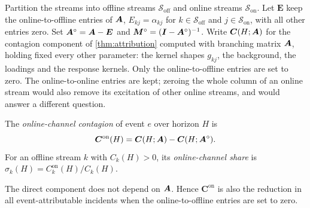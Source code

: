 Partition the streams into offline streams $\mathcal S_{\mathrm{off}}$ and online
streams $\mathcal S_{\mathrm{on}}$. Let $\bm E$ keep the online-to-offline entries of
$\bm{A}$, $E_{kj}=\alpha_{kj}$ for $k\in\mathcal S_{\mathrm{off}}$ and
$j\in\mathcal S_{\mathrm{on}}$, with all other entries zero. Set
$\bm{A}^\circ=\bm{A}-\bm E$ and $\bm{M}^\circ=(\bm{I}-\bm{A}^\circ)^{-1}$. Write
$\bm C(H;\bm{A})$ for the contagion component of \cref{thm:attribution} computed with
branching matrix $\bm{A}$, holding fixed every other parameter: the kernel shapes
$g_{kj}$, the background, the loadings and the response kernels. Only the
online-to-offline entries are set to zero. The online-to-online entries are kept;
zeroing the whole column of an online stream would also remove its excitation of
other online streams, and would answer a different question.

\begin{definition}\label{def:at-channel}
The \emph{online-channel contagion} of event $e$ over horizon $H$ is
\[
\bm C^{\mathrm{on}}(H)=\bm C(H;\bm{A})-\bm C(H;\bm{A}^\circ).
\]
For an offline stream $k$ with $C_k(H)>0$, its \emph{online-channel share} is
$\sigma_k(H)=C^{\mathrm{on}}_k(H)/C_k(H)$.
\end{definition}

The direct component does not depend on $\bm{A}$. Hence $\bm C^{\mathrm{on}}$ is also the
reduction in all event-attributable incidents when the online-to-offline entries are
set to zero.

